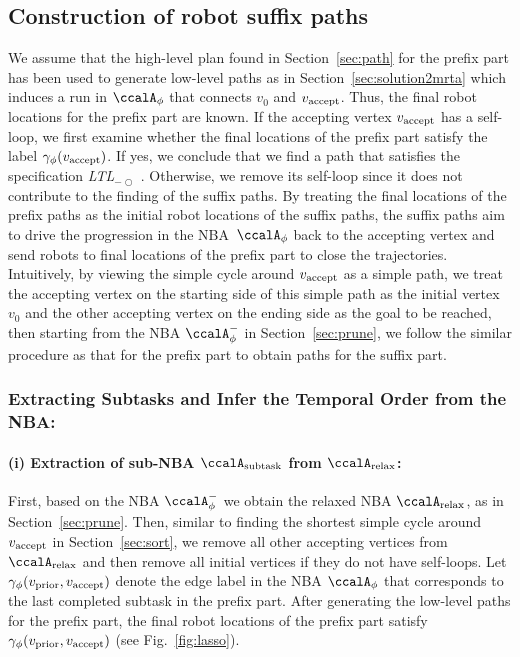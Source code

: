 \documentclass[Afour,sageh,times]{sagej}
\newcommand{\ltl}{ {\it LTL}$_{-\bigcirc}$ }
\newcommand{\auto}[1]{\ccalA_{\textup{#1}}}
\newcommand{\autop}{\ccalA_{\phi}}
\newcommand{\vertex}[1]{v_{\textup{#1}}}
\begin{document}
{{\subsection{Construction of robot suffix paths}\label{sec:suf}
We assume that the high-level plan found in Section~\ref{sec:path} for the prefix part has been used to generate low-level paths as in Section~\ref{sec:solution2mrta} which induces a run in $\autop$ that connects $v_0$ and $\vertex{accept}$. Thus, the final robot locations for the prefix part are known. If the accepting vertex $\vertex{accept}$ has a self-loop, we first examine whether the final locations of the prefix part satisfy the label $\gamma_\phi(\vertex{accept})$. If yes, we conclude that we find a path that satisfies the specification \ltl. Otherwise, we remove its self-loop since it does not contribute to the finding of the suffix paths. By treating the final locations of the prefix paths as the initial robot locations of the suffix paths, the suffix paths aim to drive the progression in the NBA~$ \autop$ back to the accepting vertex and send robots to final locations of the prefix part to close the trajectories.
Intuitively, by viewing the simple cycle around $\vertex{accept}$ as a simple path, we treat the accepting vertex on the starting side of this simple path as the initial vertex $v_0$ and the other accepting vertex on the ending side as the goal to be reached, then starting from the NBA $\autop^-$ in Section~\ref{sec:prune}, we follow the similar procedure as that for the prefix part to obtain paths for the suffix part.



  \subsubsection{Extracting Subtasks and Infer the Temporal Order from the NBA:}\label{sec:suf_prune}
  \paragraph{(i) Extraction of sub-NBA $\auto{subtask}$ from $\auto{relax}$:} First, based on the NBA $\autop^-$ we obtain the relaxed NBA $\auto{relax}$, as in Section~\ref{sec:prune}.  Then, similar to finding the shortest simple cycle around $\vertex{accept}$ in Section~\ref{sec:sort}, we remove all other accepting vertices from $\auto{relax}$ and then remove all initial vertices if they do not have self-loops. Let $\gamma_{\phi}(\vertex{prior}, \vertex{accept})$ denote the edge label in the NBA $\autop$ that corresponds to the last completed subtask in the prefix part. After generating the low-level paths for the prefix part, the final robot locations of the prefix part satisfy $\gamma_{\phi}(\vertex{prior}, \vertex{accept})$ (see Fig.~\ref{fig:lasso}).

}}
\end{document}
